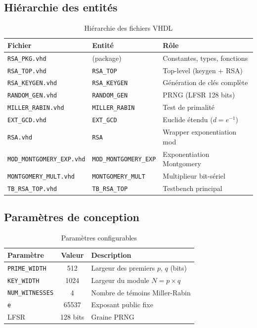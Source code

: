 \subsection{Hiérarchie des entités}

\begin{table}[H]
\centering
\caption{Hiérarchie des fichiers VHDL}
\label{tab:hierarchy}
\begin{tabular}{lll}
\toprule
\textbf{Fichier} & \textbf{Entité} & \textbf{Rôle} \\
\midrule
\texttt{RSA\_PKG.vhd}       & (package)           & Constantes, types, fonctions \\
\texttt{RSA\_TOP.vhd}       & \texttt{RSA\_TOP}   & Top-level (keygen + RSA) \\
\texttt{RSA\_KEYGEN.vhd}    & \texttt{RSA\_KEYGEN} & Génération de clés complète \\
\texttt{RANDOM\_GEN.vhd}    & \texttt{RANDOM\_GEN} & PRNG (LFSR 128 bits) \\
\texttt{MILLER\_RABIN.vhd}  & \texttt{MILLER\_RABIN} & Test de primalité \\
\texttt{EXT\_GCD.vhd}       & \texttt{EXT\_GCD}   & Euclide étendu ($d = e^{-1}$) \\
\texttt{RSA.vhd}            & \texttt{RSA}        & Wrapper exponentiation mod \\
\texttt{MOD\_MONTGOMERY\_EXP.vhd} & \texttt{MOD\_MONTGOMERY\_EXP} & Exponentiation Montgomery \\
\texttt{MONTGOMERY\_MULT.vhd} & \texttt{MONTGOMERY\_MULT} & Multiplieur bit-sériel \\
\texttt{TB\_RSA\_TOP.vhd}   & \texttt{TB\_RSA\_TOP} & Testbench principal \\
\bottomrule
\end{tabular}
\end{table}

\subsection{Paramètres de conception}

\begin{table}[H]
\centering
\caption{Paramètres configurables}
\label{tab:params}
\begin{tabular}{lcp{7cm}}
\toprule
\textbf{Paramètre} & \textbf{Valeur} & \textbf{Description} \\
\midrule
\texttt{PRIME\_WIDTH}   & 512   & Largeur des premiers $p$, $q$ (bits) \\
\texttt{KEY\_WIDTH}     & 1024  & Largeur du module $N = p \times q$ \\
\texttt{NUM\_WITNESSES} & 4     & Nombre de témoins Miller-Rabin \\
\texttt{e}              & 65537 & Exposant public fixe \\
LFSR                    & 128 bits & Graine PRNG \\
\bottomrule
\end{tabular}
\end{table}


